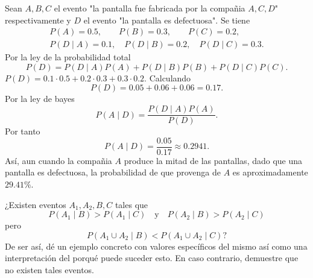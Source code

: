 \documentclass[12pt,a4paper]{article}
\begin{document}
    \begin{solucion}
        Sean $A,B,C$ el evento "la pantalla fue fabricada por la compañia $A,C,D$" respectivamente y
        $D$ el evento "la pantalla es defectuosa". Se tiene
        \begin{align*}
            P(A)=0.5,\qquad P(B)=0.3,\qquad P(C)=0.2,\\
            P(D\mid A)=0.1,\quad P(D\mid B)=0.2,\quad P(D\mid C)=0.3. 
        \end{align*}
        Por la ley de la probabilidad total
        \begin{equation*}
            P(D)=P(D\mid A)P(A)+P(D\mid B)P(B)+P(D\mid C)P(C).
        \end{equation*}
        $P(D)=0.1\cdot0.5+0.2\cdot0.3+0.3\cdot0.2$. Calculando
        \begin{equation*}
            P(D)=0.05+0.06+0.06=0.17.
        \end{equation*}
        Por la ley de bayes
        \begin{equation*}
            P(A\mid D)=\frac{P(D\mid A)P(A)}{P(D)}.
        \end{equation*}
        Por tanto
        \begin{equation*}
            P(A\mid D)=\frac{0.05}{0.17}\approx0.2941.
        \end{equation*}
        Así, aun cuando la compañia $A$ produce la mitad de las pantallas, dado que una pantalla
        es defectuosa, la probabilidad de que provenga de $A$ es aproximadamente $29.41\%$.
    \end{solucion}

    \begin{mdframed}[style=mdpinkbox,frametitle={Ejercicio 3}]
        ¿Existen eventos $A_1, A_2, B, C$ tales que 
        \[
        P(A_1 \mid B) > P(A_1 \mid C) \quad \text{y} \quad P(A_2 \mid B) > P(A_2 \mid C)
        \]
        pero
        \[
        P(A_1 \cup A_2 \mid B) < P(A_1 \cup A_2 \mid C)?
        \]
        De ser así, dé un ejemplo concreto con valores específicos del mismo así como una interpretación del porqué puede suceder esto. En caso contrario, demuestre que no existen tales eventos.
    \end{mdframed}
\end{document}
